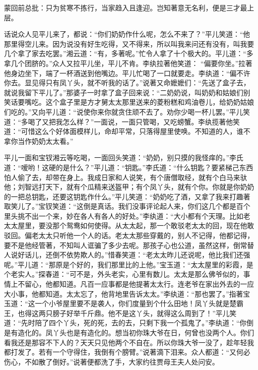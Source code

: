
\begin{parag}
    \begin{note}蒙回前总批：只为贫寒不拣行，当家趋入且逢迎。岂知著意无名利，便是三才最上层。\end{note}
\end{parag}


\begin{parag}
    话说众人见平儿来了，都说：“你们奶奶作什么呢，怎么不来了？”平儿笑道：“他那里得空儿来。因为说没有好生吃得，又不得来，所以叫我来问还有没有，叫我要几个拿了家去吃罢。”湘云道：“有，多著呢。”忙令人拿了十个极大的。平儿道：“多拿几个团脐的。”众人又拉平儿坐，平儿不肯。李纨拉著他笑道： “偏要你坐。”拉著他身边坐下，端了一杯酒送到他嘴边。平儿忙喝了一口就要走。李纨道：“偏不许你去。显见得只有凤丫头，就不听我的话了。”说著又命嬷嬷们：“先送了盒子去，就说我留下平儿了。”那婆子一时拿了盒子回来说：“二奶奶说，叫奶奶和姑娘们别笑话要嘴吃。这个盒子里是方才舅太太那里送来的菱粉糕和鸡油卷儿，给奶奶姑娘们吃的。”又向平儿道：“说使你来你就贪住顽不去了。劝你少喝一杯儿罢。”平儿笑道：“多喝了又把我怎么样？”一面说，一面只管喝，又吃螃蟹。李纨揽著他笑道：“可惜这么个好体面模样儿，命却平常，只落得屋里使唤。不知道的人，谁不拿你当作奶奶太太看。”
\end{parag}


\begin{parag}
    平儿一面和宝钗湘云等吃喝，一面回头笑道：“奶奶，别只摸的我怪痒的。”李氏道：“嗳哟！这硬的是什么？”平儿道：“钥匙。”李氏道：“什么钥匙？要紧梯己东西怕人偷了去，却带在身上。我成日家和人说笑，有个唐僧取经，就有个白马来驮他；刘智远打天下，就有个瓜精来送盔甲；有个凤丫头，就有个你。你就是你奶奶的一把总钥匙，还要这钥匙作什么。”平儿笑道：“奶奶吃了酒，又拿了我来打趣著取笑儿了。”宝钗笑道：“这倒是真话。我们没事评论起人来，你们这几个都是百个里头挑不出一个来，妙在各人有各人的好处。”李纨道：“大小都有个天理。比如老太太屋里，要没那个鸳鸯如何使得。从太太起，那一个敢驳老太太的回，现在他敢驳回。偏老太太只听他一个人的话。老太太那些穿戴的，别人不记得，他都记得，要不是他经管著，不知叫人诓骗了多少去呢。那孩子心也公道，虽然这样，倒常替人说好话儿，还倒不依势欺人的。”惜春笑道：“老太太昨儿还说呢，他比我们还强呢。”平儿道：“那原是个好的，我们那里比的上他。”宝玉道：“太太屋里的彩霞，是个老实人。”探春道：“可不是，外头老实，心里有数儿。太太是那么佛爷似的，事情上不留心，他都知道。凡百一应事都是他提著太太行。连老爷在家出外去的一应大小事，他都知道。太太忘了，他背地里告诉太太。”李纨道：“那也罢了。”指著宝玉道：“这一个小爷屋里要不是袭人，你们度量到个什么田地！凤丫头就是楚霸王，也得这两只膀子好举千斤鼎。他不是这丫头，就得这么周到了！”平儿笑道：“先时陪了四个丫头，死的死，去的去，只剩下我一个孤鬼了。”李纨道：“你倒是有造化的。凤丫头也是有造化的。想当初你珠大爷在日，何曾也没两个人。你们看我还是那容不下人的？天天只见他两个不自在。所以你珠大爷一没了，趁年轻我都打发了。若有一个守得住，我倒有个膀臂。”说著滴下泪来。众人都道：“又何必伤心，不如散了倒好。”说著便都洗了手，大家约往贾母王夫人处问安。
\end{parag}


